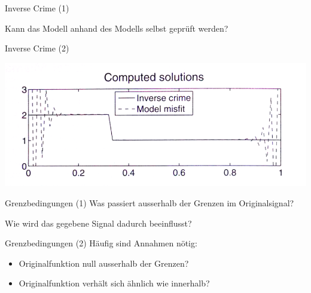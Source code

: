 \documentclass[11pt]{beamer}
\begin{document}
\begin{frame}{Inverse Crime (1)}

Kann das Modell anhand des Modells selbst geprüft werden?
\end{frame}



\begin{frame}{Inverse Crime (2)}

\begin{center}

\includegraphics[scale=0.5]{InverseCrime} 

\end{center}

\end{frame}


\begin{frame}{Grenzbedingungen (1)}
Was passiert ausserhalb der Grenzen im Originalsignal?

Wie wird das gegebene Signal dadurch beeinflusst?
\end{frame}


\begin{frame}{Grenzbedingungen (2)}
Häufig sind Annahmen nötig:
\begin{itemize}
\item Originalfunktion null ausserhalb der Grenzen?
\item Originalfunktion verhält sich ähnlich wie innerhalb?
\end{itemize}
\end{frame}
\end{document}
